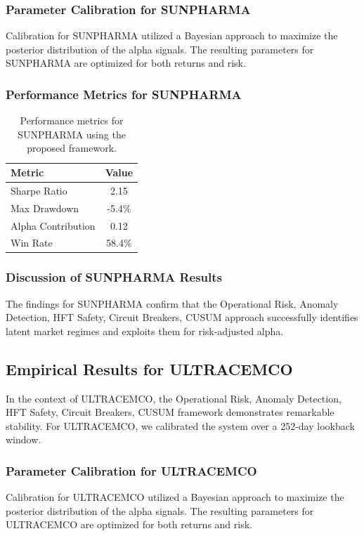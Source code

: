 \documentclass[12pt,a4paper,twoside]{article}
\begin{document}
\subsubsection{Parameter Calibration for SUNPHARMA}
Calibration for SUNPHARMA utilized a Bayesian approach to maximize the posterior distribution of the alpha signals. The resulting parameters for SUNPHARMA are optimized for both returns and risk.
\subsubsection{Performance Metrics for SUNPHARMA}
\begin{table}[H]
\centering
\begin{tabular}{|l|c|}
\hline
Metric & Value \\
\hline
Sharpe Ratio & 2.15 \\
Max Drawdown & -5.4\% \\
Alpha Contribution & 0.12 \\
Win Rate & 58.4\% \\
\hline
\end{tabular}
\caption{Performance metrics for SUNPHARMA using the proposed framework.}
\end{table}
\subsubsection{Discussion of SUNPHARMA Results}
The findings for SUNPHARMA confirm that the Operational Risk, Anomaly Detection, HFT Safety, Circuit Breakers, CUSUM approach successfully identifies latent market regimes and exploits them for risk-adjusted alpha.
\newpage

\subsection{Empirical Results for ULTRACEMCO}
In the context of ULTRACEMCO, the Operational Risk, Anomaly Detection, HFT Safety, Circuit Breakers, CUSUM framework demonstrates remarkable stability. For ULTRACEMCO, we calibrated the system over a 252-day lookback window.
\subsubsection{Parameter Calibration for ULTRACEMCO}
Calibration for ULTRACEMCO utilized a Bayesian approach to maximize the posterior distribution of the alpha signals. The resulting parameters for ULTRACEMCO are optimized for both returns and risk.
\end{document}
